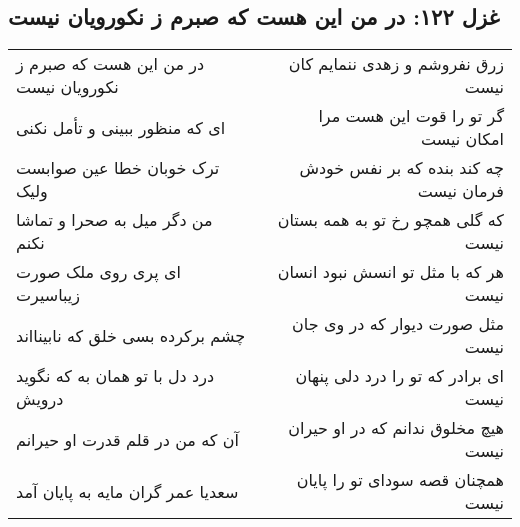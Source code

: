 \begin{center}
\section*{غزل ۱۲۲: در من این هست که صبرم ز نکورویان نیست}
\label{sec:122}
\begin{longtable}{l p{0.5cm} r}
در من این هست که صبرم ز نکورویان نیست
&&
زرق نفروشم و زهدی ننمایم کان نیست
\\
ای که منظور ببینی و تأمل نکنی
&&
گر تو را قوت این هست مرا امکان نیست
\\
ترک خوبان خطا عین صوابست ولیک
&&
چه کند بنده که بر نفس خودش فرمان نیست
\\
من دگر میل به صحرا و تماشا نکنم
&&
که گلی همچو رخ تو به همه بستان نیست
\\
ای پری روی ملک صورت زیباسیرت
&&
هر که با مثل تو انسش نبود انسان نیست
\\
چشم برکرده بسی خلق که نابینااند
&&
مثل صورت دیوار که در وی جان نیست
\\
درد دل با تو همان به که نگوید درویش
&&
ای برادر که تو را درد دلی پنهان نیست
\\
آن که من در قلم قدرت او حیرانم
&&
هیچ مخلوق ندانم که در او حیران نیست
\\
سعدیا عمر گران مایه به پایان آمد
&&
همچنان قصه سودای تو را پایان نیست
\\
\end{longtable}
\end{center}
